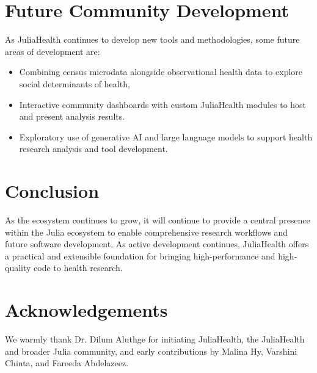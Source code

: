 \documentclass{juliacon}
\begin{document}
\section{Future Community Development}

As JuliaHealth continues to develop new tools and methodologies, some future areas of development are:

\begin{itemize}[label={\small\textbullet}, leftmargin=*, itemsep=4pt, labelsep=8pt]
    \item Combining census microdata alongside observational health data to explore social determinants of health,
    \item Interactive community dashboards with custom JuliaHealth modules to host and present analysis results.
    \item Exploratory use of generative AI and large language models to support health research analysis and tool development.
\end{itemize}

\section{Conclusion}

As the ecosystem continues to grow, it will continue to provide a central presence within the Julia ecosystem to enable comprehensive research workflows and future software development.
As active development continues, JuliaHealth offers a practical and extensible foundation for bringing high-performance and high-quality code to health research.

\section{Acknowledgements}

We warmly thank Dr. Dilum Aluthge for initiating JuliaHealth, the JuliaHealth and broader Julia community, and early contributions by Malina Hy, Varshini Chinta, and Fareeda Abdelazeez.



\end{document}
